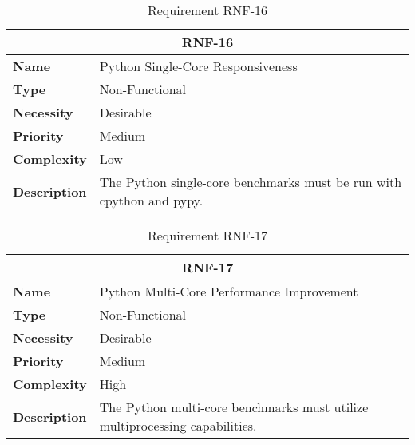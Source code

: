 \begin{table}[H]
    \centering
    \begin{tabular}{l p{10cm}}
        \toprule
        \multicolumn{2}{c}{\textbf{RNF-16}} \\
        \toprule
        \textbf{Name}         & Python Single-Core Responsiveness \\
        \textbf{Type}         & Non-Functional \\
        \textbf{Necessity}    & Desirable \\
        \textbf{Priority}     & Medium \\
        \textbf{Complexity}   & Low \\
        \textbf{Description}  & The Python single-core benchmarks must be run with \gls{cpython} and \gls{pypy}. \\
        \bottomrule
    \end{tabular}
\caption{Requirement RNF-16}\label{tab:rnf-16}
\end{table}

\begin{table}[H]
    \centering
    \begin{tabular}{l p{10cm}}
        \toprule
        \multicolumn{2}{c}{\textbf{RNF-17}} \\
        \toprule
        \textbf{Name}         & Python Multi-Core Performance Improvement \\
        \textbf{Type}         & Non-Functional \\
        \textbf{Necessity}    & Desirable \\
        \textbf{Priority}     & Medium \\
        \textbf{Complexity}   & High \\
        \textbf{Description}  & The Python multi-core benchmarks must utilize multiprocessing capabilities. \\
        \bottomrule
    \end{tabular}
\caption{Requirement RNF-17}\label{tab:rnf-17}
\end{table}
